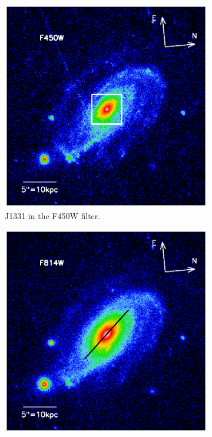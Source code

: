 \documentclass[useAMS,usenatbib]{mnras}
\begin{document}
\begin{figure}
\centering
\begin{subfigure}{.5\textwidth}
  \centering
  \includegraphics[width=.9\linewidth]{first_glimpse_450.ps}
  \caption{J1331 in the F450W filter.}
  \label{fig:F450W}
\end{subfigure}%
\begin{subfigure}{.5\textwidth}
  \centering
  \includegraphics[width=.9\linewidth]{first_glimpse_814.ps}

\end{subfigure}
\end{figure}
\end{document}
